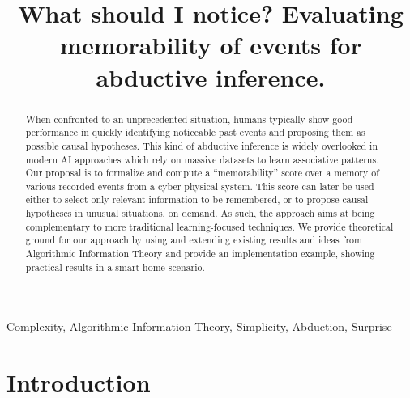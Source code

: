 \documentclass[conference]{IEEEtran}
\begin{document}
\title{
  What should I notice? Evaluating memorability of events for abductive inference.
}
\author{

}

\maketitle

\begin{abstract}
  When confronted to an unprecedented situation, humans typically show good
  performance in quickly identifying noticeable past events and proposing them
  as possible causal hypotheses. This kind of abductive inference is widely
  overlooked in modern AI approaches which rely on massive datasets to learn
  associative patterns. Our proposal is to formalize and compute a ``memorability''
  score over a memory of various recorded events from a cyber-physical system.
 This score can later be used either to select only relevant information to be
 remembered, or to propose causal hypotheses in unusual situations, on demand.
 As such, the approach aims at being complementary to more traditional
 learning-focused techniques. We provide theoretical ground for our approach by
 using and extending existing results and ideas from Algorithmic Information
 Theory and provide an implementation example, showing practical results in a
 smart-home scenario.
\end{abstract}

\begin{IEEEkeywords}
  Complexity, Algorithmic Information Theory, Simplicity, Abduction, Surprise
\end{IEEEkeywords}

\section{Introduction}

\end{document}
